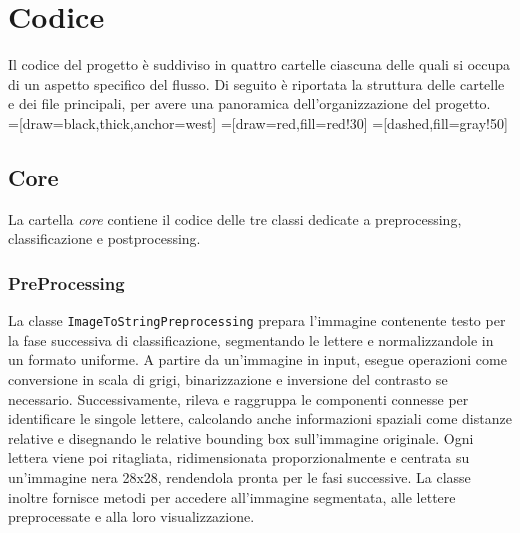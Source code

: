 \chapter{Codice}
Il codice del progetto è suddiviso in quattro cartelle ciascuna delle quali si occupa di un aspetto specifico del flusso. Di seguito è riportata la struttura delle cartelle e dei file principali, per avere una panoramica dell'organizzazione del progetto. \\ 

=[draw=black,thick,anchor=west]
=[draw=red,fill=red!30]
=[dashed,fill=gray!50]

\section{Core}
La cartella \emph{core} contiene il codice delle tre classi dedicate a preprocessing, classificazione e postprocessing.

\subsection{PreProcessing}
La classe \texttt{ImageToStringPreprocessing} prepara l'immagine contenente testo per la fase successiva di classificazione, segmentando le lettere e normalizzandole in un formato uniforme. A partire da un'immagine in input, esegue operazioni come conversione in scala di grigi, binarizzazione e inversione del contrasto se necessario. 
Successivamente, rileva e raggruppa le componenti connesse per identificare le singole lettere, calcolando anche informazioni spaziali come distanze relative e disegnando le relative bounding box sull'immagine originale.
Ogni lettera viene poi ritagliata, ridimensionata proporzionalmente e centrata su un'immagine nera 28x28, rendendola pronta per le fasi successive. La classe inoltre fornisce metodi per accedere all'immagine segmentata, alle lettere preprocessate e alla loro visualizzazione.

